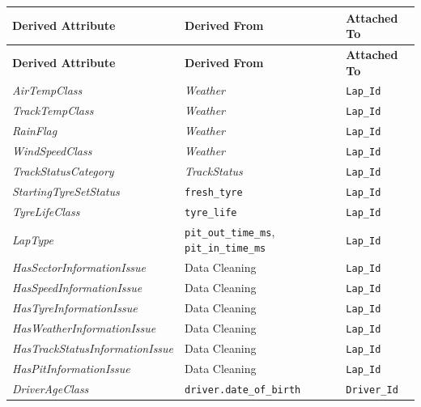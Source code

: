 \documentclass[a4paper,11pt]{article}
\begin{document}
	\begin{longtable}{|p{5.5cm}|p{4cm}|p{3.2cm}|}
		\hline
		\textbf{Derived Attribute} & \textbf{Derived From} & \textbf{Attached To} \\
		\hline
		\endfirsthead
		
		\hline
		\textbf{Derived Attribute} & \textbf{Derived From} & \textbf{Attached To} \\
		\hline
		\endhead
		
		\textit{AirTempClass}
		& \textit{Weather}
		& \texttt{Lap\_Id} \\
		\hline
		
		\textit{TrackTempClass}
		& \textit{Weather}
		& \texttt{Lap\_Id} \\
		\hline
		
		\textit{RainFlag}
		& \textit{Weather}
		& \texttt{Lap\_Id} \\
		\hline
		
		\textit{WindSpeedClass}
		& \textit{Weather}
		& \texttt{Lap\_Id} \\
		\hline
		
		\textit{TrackStatusCategory}
		& \textit{TrackStatus}
		& \texttt{Lap\_Id} \\
		\hline
		
		\textit{StartingTyreSetStatus}
		& \texttt{fresh\_tyre}
		& \texttt{Lap\_Id} \\
		\hline
		
		\textit{TyreLifeClass}
		& \texttt{tyre\_life}
		& \texttt{Lap\_Id} \\
		\hline
		
		\textit{LapType}
		& \texttt{pit\_out\_time\_ms}, \texttt{pit\_in\_time\_ms}
		& \texttt{Lap\_Id} \\
		\hline
		
		\textit{HasSectorInformationIssue}
		& Data Cleaning
		& \texttt{Lap\_Id} \\
		\hline
		
		\textit{HasSpeedInformationIssue}
		& Data Cleaning
		& \texttt{Lap\_Id} \\
		\hline
		
		\textit{HasTyreInformationIssue}
		& Data Cleaning
		& \texttt{Lap\_Id} \\
		\hline
		
		\textit{HasWeatherInformationIssue}
		& Data Cleaning
		& \texttt{Lap\_Id} \\
		\hline
		
		\textit{HasTrackStatusInformationIssue}
		& Data Cleaning
		& \texttt{Lap\_Id} \\
		\hline
		
		\textit{HasPitInformationIssue}
		& Data Cleaning
		& \texttt{Lap\_Id} \\
		\hline
		
		\textit{DriverAgeClass}
		& \texttt{driver.date\_of\_birth}
		& \texttt{Driver\_Id} \\
		\hline
	\end{longtable}
\end{document}
